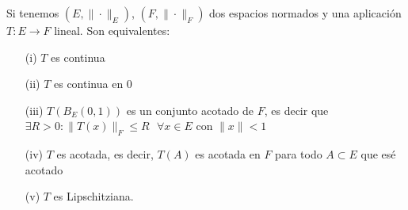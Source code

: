 \begin{observacion}
    Si tenemos $(E, \|\cdot\|_E)$, $(F, \|\cdot\|_F)$ dos espacios normados y una aplicación $T:E\to F$ lineal. Son equivalentes:
    \begin{enumerate}
        \item[(i)] $T$ es continua
        \item[(ii)] $T$ es continua en $0$
        \item[(iii)] $T(B_E(0,1))$ es un conjunto acotado de $F$, es decir que $\exists R>0 : \|T(x)\|_F \leq R\ \ \ \forall x\in E$ con $\|x\|<1$
        \item[(iv)] $T$ es acotada, es decir, $T(A)$ es acotada en $F$ para todo $A\subset E$ que esé acotado
        \item[(v)] $T$ es Lipschitziana.
    \end{enumerate}
    


\end{observacion}
